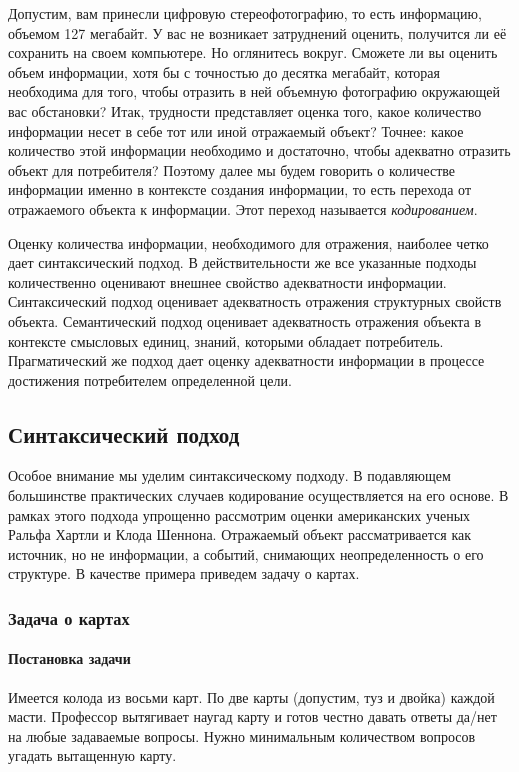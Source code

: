 Допустим, вам принесли цифровую стереофотографию, то есть информацию, объемом 127 мегабайт. У вас не возникает затруднений оценить, получится ли её сохранить на своем компьютере. Но оглянитесь вокруг. Сможете ли вы оценить объем информации, хотя бы с точностью до десятка мегабайт, которая необходима для того, чтобы отразить в ней объемную фотографию окружающей вас обстановки?
Итак, трудности представляет оценка того, какое количество информации несет в себе тот или иной отражаемый объект? Точнее: какое количество этой информации необходимо и достаточно, чтобы адекватно отразить объект для потребителя? Поэтому далее мы будем говорить о количестве информации именно в контексте создания информации, то есть перехода от отражаемого объекта к информации. Этот переход называется \emph{кодированием}.

Оценку количества информации, необходимого для отражения, наиболее четко дает синтаксический подход. В действительности же все указанные подходы количественно оценивают внешнее свойство адекватности информации. Синтаксический подход оценивает адекватность отражения структурных свойств объекта. Семантический подход оценивает адекватность отражения объекта в контексте смысловых единиц, знаний, которыми обладает потребитель. Прагматический же подход дает оценку адекватности информации в процессе достижения потребителем определенной цели.


\subsection{Синтаксический подход}

Особое внимание мы уделим синтаксическому подходу. В подавляющем большинстве практических случаев кодирование осуществляется на его основе. В рамках этого подхода упрощенно рассмотрим оценки американских ученых Ральфа Хартли и Клода Шеннона.
Отражаемый объект рассматривается как источник, но не информации, а событий, снимающих неопределенность о его структуре. В качестве примера приведем задачу о картах.

\begin{frame}
\frametitle{Задача о картах}
\framesubtitle{Постановка задачи}
\begin{example}
    Имеется колода из восьми карт. По две карты (допустим, туз и двойка) каждой масти. Профессор вытягивает наугад карту и готов честно давать ответы да/нет на любые задаваемые вопросы. Нужно минимальным количеством вопросов угадать вытащенную карту.
\end{example} 
\end{frame}

